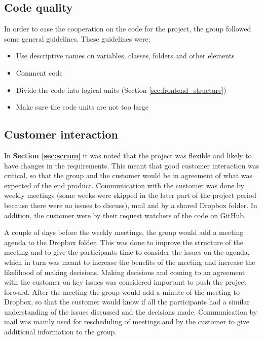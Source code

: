 \subsection{Code quality}

In order to ease the cooperation on the code for the project, the group followed some general guidelines. These guidelines were:
\begin{itemize}
	\item Use descriptive names on variables, classes, folders and other elements
	\item Comment code
	\item Divide the code into logical units (Section \ref{sec:frontend_structure})
	\item Make sure the code units are not too large
\end{itemize}

\subsection{Customer interaction}

In \textbf{Section \ref{sec:scrum}} it was noted that the project was flexible and likely to have changes in the requirements. This meant that good customer interaction was critical, so that the group and the customer would be in agreement of what was expected of the end product. Communication with the customer was done by weekly meetings (some weeks were skipped in the later part of the project period because there were no issues to discuss), mail and by a shared Dropbox folder. In addition, the customer were by their request watchers of the code on GitHub. \newline

A couple of days before the weekly meetings, the group would add a meeting agenda to the Dropbox folder. This was done to improve the structure of the meeting and to give the participants time to consider the issues on the agenda, which in turn was meant to increase the benefits of the meeting and increase the likelihood of making decisions. Making decisions and coming to an agreement with the customer on key issues was considered important to push the project forward. After the meeting the group would add a minute of the meeting to Dropbox, so that the customer would know if all the participants had a similar understanding of the issues discussed and the decisions made. Communication by mail was mainly used for rescheduling of meetings and by the customer to give additional information to the group. 

\cleardoublepage